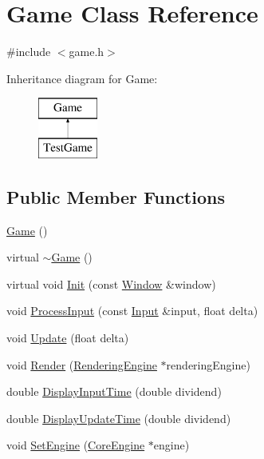 \hypertarget{class_game}{}\section{Game Class Reference}
\label{class_game}


{\ttfamily \#include $<$game.\+h$>$}

Inheritance diagram for Game\+:\begin{figure}[H]
\begin{center}
\leavevmode
\includegraphics[height=2.000000cm]{class_game}
\end{center}
\end{figure}
\subsection*{Public Member Functions}
\begin{DoxyCompactItemize}
\item 
\hyperlink{class_game_ad59df6562a58a614fda24622d3715b65}{Game} ()
\item 
virtual \hyperlink{class_game_a72772b628443c3675976d6b5e6c9ec2a}{$\sim$\+Game} ()
\item 
virtual void \hyperlink{class_game_ad47d16f9908f7b9304bcd31db0717e0b}{Init} (const \hyperlink{class_window}{Window} \&window)
\item 
void \hyperlink{class_game_ab64891eae2c4eb4f3bf7d161c6d5e37a}{Process\+Input} (const \hyperlink{class_input}{Input} \&input, float delta)
\item 
void \hyperlink{class_game_a6ad207394e4ce91f909d49c87802da08}{Update} (float delta)
\item 
void \hyperlink{class_game_a5fae2de88740658b07d98972d4b4ed26}{Render} (\hyperlink{class_rendering_engine}{Rendering\+Engine} $\ast$rendering\+Engine)
\item 
double \hyperlink{class_game_a18483e75040298401c19befdce191aa5}{Display\+Input\+Time} (double dividend)
\item 
double \hyperlink{class_game_aec51184864470a1554fd22a47e25a0e2}{Display\+Update\+Time} (double dividend)
\item 
void \hyperlink{class_game_ab7ee30cf8ff9dd65e527b6fd1a2bd333}{Set\+Engine} (\hyperlink{class_core_engine}{Core\+Engine} $\ast$engine)
\end{DoxyCompactItemize}
